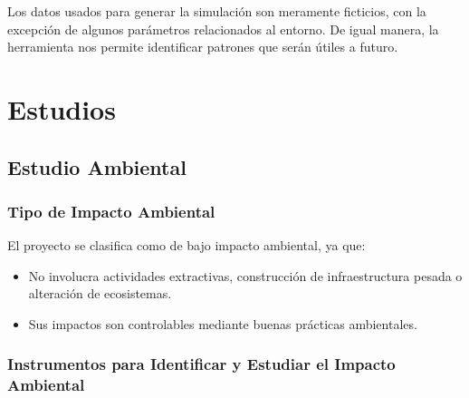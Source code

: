 \documentclass[letterpaper, 11pt]{report}
\begin{document}
Los datos usados para generar la simulación son meramente ficticios, con la
excepción de algunos parámetros relacionados al entorno. De igual manera, la
herramienta nos permite identificar patrones que serán útiles a futuro.




\section{Estudios}

\subsection{Estudio Ambiental}

\subsubsection{Tipo de Impacto Ambiental}

El proyecto se clasifica como de bajo impacto ambiental, ya que: 

\begin{itemize}
      \item No involucra actividades extractivas, construcción de infraestructura 
      pesada o alteración de ecosistemas. 
      
      \item Sus impactos son controlables mediante buenas prácticas ambientales. 
\end{itemize}

\subsubsection{Instrumentos para Identificar y Estudiar el Impacto Ambiental}
\end{document}
